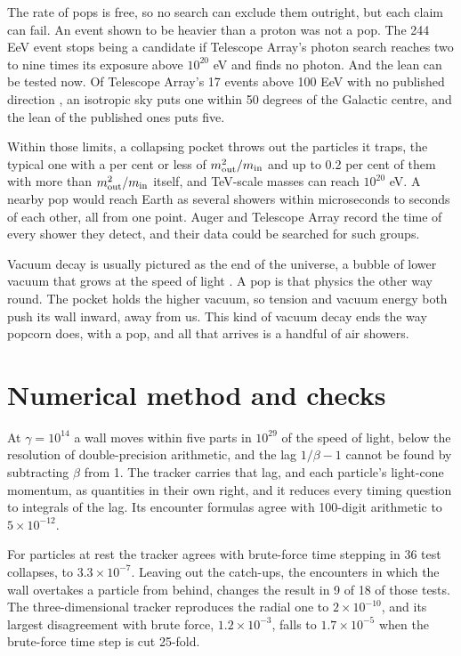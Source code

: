 \documentclass[10pt,twocolumn,a4paper]{article}
\begin{document}
The rate of pops is free, so no search can exclude them outright, but each claim can fail. An event
shown to be heavier than a proton was not a pop. The 244 EeV event stops being a candidate if
Telescope Array's photon search reaches two to nine times its exposure above $10^{20}$ eV and finds
no photon. And the lean can be tested now. Of Telescope Array's 17 events above 100 EeV with no
published direction \citep{TelescopeArrayCollaboration2023}, an isotropic sky puts one within 50
degrees of the Galactic centre, and the lean of the published ones puts five.

Within those limits, a collapsing pocket throws out the particles it traps, the typical one with a
per cent or less of $m_{\rm out}^2/m_{\rm in}$ and up to 0.2 per cent of them with more than $m_{\rm
out}^2/m_{\rm in}$ itself, and TeV-scale masses can reach $10^{20}$ eV. A nearby pop would reach
Earth as several showers within microseconds to seconds of each other, all from one point. Auger and
Telescope Array record the time of every shower they detect, and their data could be searched for
such groups.

Vacuum decay is usually pictured as the end of the universe, a bubble of lower vacuum that grows at
the speed of light \citep{Coleman1980}. A pop is that physics the other way round. The pocket holds
the higher vacuum, so tension and vacuum energy both push its wall inward, away from us. This kind
of vacuum decay ends the way popcorn does, with a pop, and all that arrives is a handful of air
showers.

\appendix
\section{Numerical method and checks}

At $\gamma = 10^{14}$ a wall moves within five parts in $10^{29}$ of the speed of light, below the
resolution of double-precision arithmetic, and the lag $1/\beta - 1$ cannot be found by subtracting
$\beta$ from 1. The tracker carries that lag, and each particle's light-cone momentum, as quantities
in their own right, and it reduces every timing question to integrals of the lag. Its encounter
formulas agree with 100-digit arithmetic to $5\times10^{-12}$.

For particles at rest the tracker agrees with brute-force time stepping in 36 test collapses, to
$3.3\times10^{-7}$. Leaving out the catch-ups, the encounters in which the wall overtakes a particle
from behind, changes the result in 9 of 18 of those tests. The three-dimensional tracker reproduces
the radial one to $2\times10^{-10}$, and its largest disagreement with brute force,
$1.2\times10^{-3}$, falls to $1.7\times10^{-5}$ when the brute-force time step is cut 25-fold.
\end{document}
